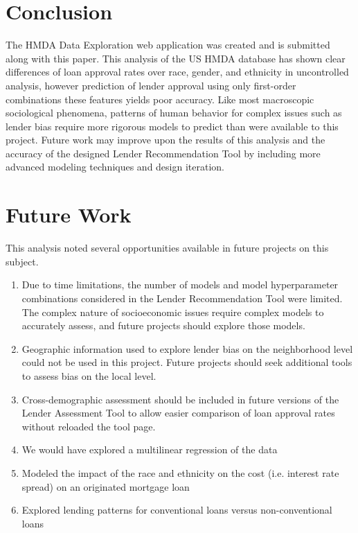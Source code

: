 \documentclass[conference,compsoc]{IEEEtran}
\begin{document}




\section{Conclusion}
The HMDA Data Exploration web application was created and is submitted along with this paper. This analysis of the US HMDA database has shown clear differences of loan approval rates over race, gender, and ethnicity in uncontrolled analysis, however prediction of lender approval using only first-order combinations these features yields poor accuracy. Like most macroscopic sociological phenomena, patterns of human behavior for complex issues such as lender bias require more rigorous models to predict than were available to this project. Future work may improve upon the results of this analysis and the accuracy of the designed Lender Recommendation Tool by including more advanced modeling techniques and design iteration.


\section{Future Work}

This analysis noted several opportunities available in future projects on this subject.

\begin{enumerate}

\item Due to time limitations, the number of models and model hyperparameter combinations considered in the Lender Recommendation Tool  were limited. The complex nature of socioeconomic issues require complex models to accurately assess, and future projects should explore those models. 
\item Geographic information used to explore lender bias on the neighborhood level could not be used in this project. Future projects should seek additional tools to assess bias on the local level.
\item Cross-demographic assessment should be included in future versions of the Lender Assessment Tool to allow easier comparison of loan approval rates without reloaded the tool page.
\item We would have explored a multilinear regression of the data
\item Modeled the impact of the race and ethnicity on the cost (i.e. interest rate spread) on an originated mortgage loan
\item Explored lending patterns for conventional loans versus non-conventional loans

\end{enumerate}
\end{document}
